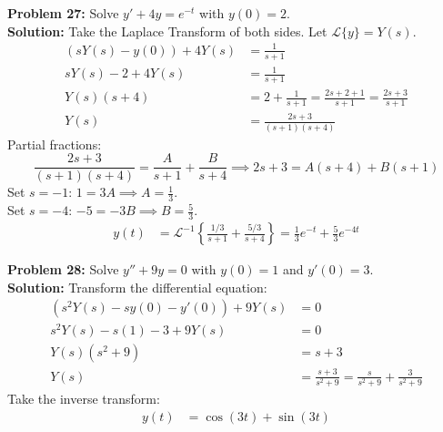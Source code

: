 \documentclass[11pt, letterpaper]{article}
\theoremstyle{definition}
\theoremstyle{remark}
\begin{document}
\vspace{1em}
\textbf{Problem 27:} Solve $y' + 4y = e^{-t}$ with $y(0) = 2$.
\vspace{0.5em} \\
\textbf{Solution:} Take the Laplace Transform of both sides. Let $\mathscr{L}\{y\} = Y(s)$.
\begin{align*}
    (sY(s) - y(0)) + 4Y(s) &= \frac{1}{s + 1} \\[4pt]
    sY(s) - 2 + 4Y(s) &= \frac{1}{s + 1} \\[4pt]
    Y(s)(s + 4) &= 2 + \frac{1}{s + 1} = \frac{2s + 2 + 1}{s + 1} = \frac{2s + 3}{s + 1} \\[4pt]
    Y(s) &= \frac{2s + 3}{(s + 1)(s + 4)}
\end{align*}
Partial fractions:
\[
\frac{2s + 3}{(s + 1)(s + 4)} = \frac{A}{s + 1} + \frac{B}{s + 4} \implies 2s + 3 = A(s + 4) + B(s + 1)
\]
Set $s = -1$: $1 = 3A \implies A = \frac{1}{3}$. \\ \relax
Set $s = -4$: $-5 = -3B \implies B = \frac{5}{3}$.
\begin{align*}
    y(t) &= \mathscr{L}^{-1}\left\{\frac{1/3}{s + 1} + \frac{5/3}{s + 4}\right\} = \frac{1}{3}e^{-t} + \frac{5}{3}e^{-4t}
\end{align*}

\vspace{1em}
\textbf{Problem 28:} Solve $y'' + 9y = 0$ with $y(0) = 1$ and $y'(0) = 3$.
\vspace{0.5em} \\
\textbf{Solution:} Transform the differential equation:
\begin{align*}
    (s^2Y(s) - sy(0) - y'(0)) + 9Y(s) &= 0 \\[4pt]
    s^2Y(s) - s(1) - 3 + 9Y(s) &= 0 \\[4pt]
    Y(s)(s^2 + 9) &= s + 3 \\[4pt]
    Y(s) &= \frac{s + 3}{s^2 + 9} = \frac{s}{s^2 + 9} + \frac{3}{s^2 + 9}
\end{align*}
Take the inverse transform:
\begin{align*}
    y(t) &= \cos(3t) + \sin(3t)
\end{align*}
\end{document}
